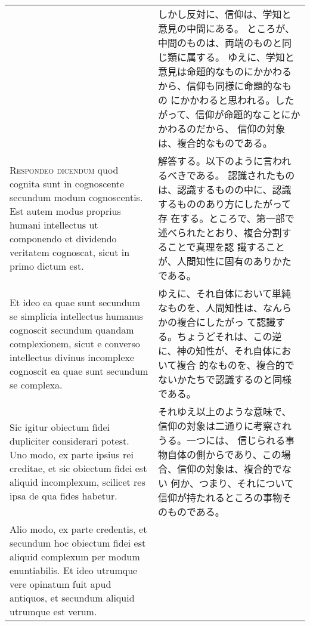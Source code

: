\documentclass[10pt]{jsarticle} %
\begin{document}
\begin{longtable}{p{21em}p{21em}}
&


しかし反対に、信仰は、学知と意見の中間にある。
ところが、中間のものは、両端のものと同じ類に属する。
ゆえに、学知と意見は命題的なものにかかわるから、信仰も同様に命題的なもの
 にかかわると思われる。したがって、信仰が命題的なことにかかわるのだから、
 信仰の対象は、複合的なものである。

\\


{\scshape Respondeo dicendum} quod cognita sunt in
cognoscente secundum modum cognoscentis. Est autem modus proprius humani
intellectus ut componendo et dividendo veritatem cognoscat, sicut in
primo dictum est.

&

解答する。以下のように言われるべきである。
認識されたものは、認識するものの中に、認識するもののあり方にしたがって存
 在する。ところで、第一部で述べられたとおり、複合分割することで真理を認
 識することが、人間知性に固有のありかたである。

\\


 Et ideo ea quae sunt secundum se simplicia intellectus
humanus cognoscit secundum quandam complexionem, sicut e converso
intellectus divinus incomplexe cognoscit ea quae sunt secundum se
complexa.


&

ゆえに、それ自体において単純なものを、人間知性は、なんらかの複合にしたがっ
 て認識する。ちょうどそれは、この逆に、神の知性が、それ自体において複合
 的なものを、複合的でないかたちで認識するのと同様である。

\\

 Sic igitur obiectum fidei dupliciter considerari potest. Uno
modo, ex parte ipsius rei creditae, et sic obiectum fidei est aliquid
incomplexum, scilicet res ipsa de qua fides habetur.

&

それゆえ以上のような意味で、信仰の対象は二通りに考察されうる。一つには、
 信じられる事物自体の側からであり、この場合、信仰の対象は、複合的でない
 何か、つまり、それについて信仰が持たれるところの事物そのものである。

\\

 Alio modo, ex parte
credentis, et secundum hoc obiectum fidei est aliquid complexum per
modum enuntiabilis. Et ideo utrumque vere opinatum fuit apud antiquos,
et secundum aliquid utrumque est verum.

&


\end{longtable}
\end{document}
